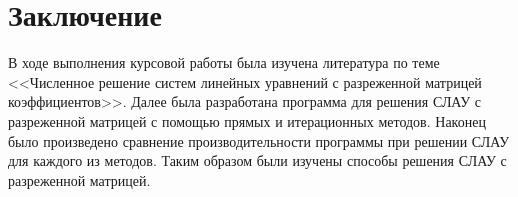 \documentclass[a4paper, fontsize=14pt]{article}
\begin{document}
\newpage

\section*{Заключение}
В ходе выполнения курсовой работы была изучена литература по теме <<Численное решение систем
линейных уравнений с разреженной матрицей коэффициентов>>. 
Далее была разработана программа для решения СЛАУ с разреженной матрицей с помощью прямых и
итерационных методов.  Наконец было произведено сравнение производительности программы при
решении СЛАУ для каждого из методов. Таким образом были изучены способы решения СЛАУ с разреженной
матрицей.


\newpage


\printbibliography
\end{document}
